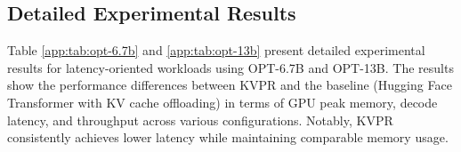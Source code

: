 \documentclass[11pt]{article}
\newcommand{\paperName}{KVPR}
\begin{document}
\subsection{Detailed Experimental Results}
\label{app:detailed-exp}
Table \ref{app:tab:opt-6.7b} and \ref{app:tab:opt-13b} present detailed experimental results for latency-oriented workloads using OPT-6.7B and OPT-13B. The results show the performance differences between {\paperName} and the baseline (Hugging Face Transformer with KV cache offloading) in terms of GPU peak memory, decode latency, and throughput across various configurations. Notably, {\paperName} consistently achieves lower latency while maintaining comparable memory usage.


\begin{table}[h]
\centering
{}
\end{table}
\end{document}
